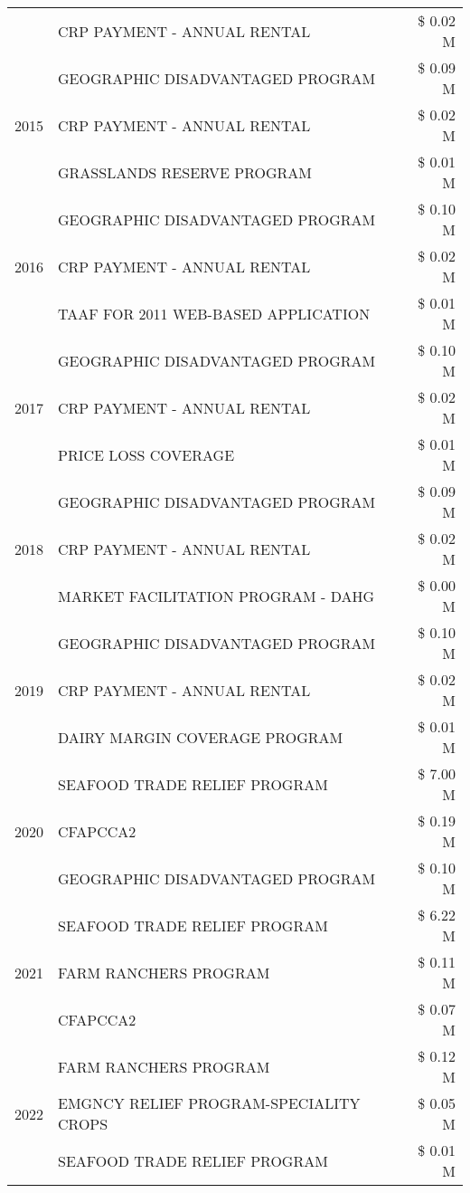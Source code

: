 \begin{tabular}{llr}
 & CRP PAYMENT - ANNUAL RENTAL & \$ 0.02 M \\
\cline{1-3}
\multirow[t]{3}{*}{2015} & GEOGRAPHIC DISADVANTAGED PROGRAM & \$ 0.09 M \\
 & CRP PAYMENT - ANNUAL RENTAL & \$ 0.02 M \\
 & GRASSLANDS RESERVE PROGRAM & \$ 0.01 M \\
\cline{1-3}
\multirow[t]{3}{*}{2016} & GEOGRAPHIC DISADVANTAGED PROGRAM & \$ 0.10 M \\
 & CRP PAYMENT - ANNUAL RENTAL & \$ 0.02 M \\
 & TAAF FOR 2011 WEB-BASED APPLICATION & \$ 0.01 M \\
\cline{1-3}
\multirow[t]{3}{*}{2017} & GEOGRAPHIC DISADVANTAGED PROGRAM & \$ 0.10 M \\
 & CRP PAYMENT - ANNUAL RENTAL & \$ 0.02 M \\
 & PRICE LOSS COVERAGE & \$ 0.01 M \\
\cline{1-3}
\multirow[t]{3}{*}{2018} & GEOGRAPHIC DISADVANTAGED PROGRAM & \$ 0.09 M \\
 & CRP PAYMENT - ANNUAL RENTAL & \$ 0.02 M \\
 & MARKET FACILITATION PROGRAM - DAHG & \$ 0.00 M \\
\cline{1-3}
\multirow[t]{3}{*}{2019} & GEOGRAPHIC DISADVANTAGED PROGRAM & \$ 0.10 M \\
 & CRP PAYMENT - ANNUAL RENTAL & \$ 0.02 M \\
 & DAIRY MARGIN COVERAGE PROGRAM & \$ 0.01 M \\
\cline{1-3}
\multirow[t]{3}{*}{2020} & SEAFOOD TRADE RELIEF PROGRAM & \$ 7.00 M \\
 & CFAPCCA2 & \$ 0.19 M \\
 & GEOGRAPHIC DISADVANTAGED PROGRAM & \$ 0.10 M \\
\cline{1-3}
\multirow[t]{3}{*}{2021} & SEAFOOD TRADE RELIEF PROGRAM & \$ 6.22 M \\
 & FARM RANCHERS PROGRAM & \$ 0.11 M \\
 & CFAPCCA2 & \$ 0.07 M \\
\cline{1-3}
\multirow[t]{3}{*}{2022} & FARM RANCHERS PROGRAM & \$ 0.12 M \\
 & EMGNCY RELIEF PROGRAM-SPECIALITY CROPS & \$ 0.05 M \\
 & SEAFOOD TRADE RELIEF PROGRAM & \$ 0.01 M \\
\cline{1-3}
\bottomrule
\end{tabular}
